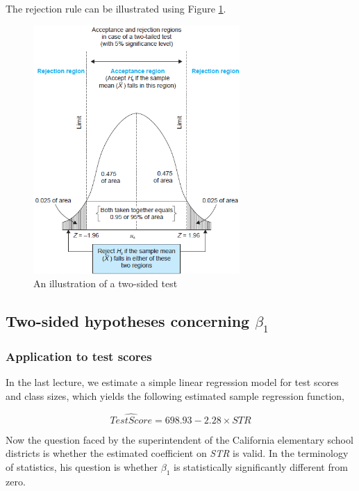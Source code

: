 \documentclass[a4paper,11pt]{article}
\begin{document}
\begin{itemize}
The rejection rule can be illustrated using Figure \ref{fig:orgf9bfd90}.

\begin{figure}[htbp]
\centering
\includegraphics[width=0.7\textwidth]{./figure/fig9_1.png}
\caption{\label{fig:orgf9bfd90}
An illustration of a two-sided test}
\end{figure}
\end{itemize}

\subsection{Two-sided hypotheses concerning \(\beta_1\)}
\label{sec:orgac15208}
\subsubsection*{Application to test scores}
\label{sec:orgaeeafd2}
In the last lecture, we estimate a simple linear regression model for test
scores and class sizes, which yields the following estimated sample
regression function,

\begin{equation}
\label{eq:testscr-str-1e}
\widehat{TestScore} = 698.93 - 2.28 \times STR
\end{equation}

Now the question faced by the superintendent of the California
elementary school districts is whether the estimated coefficient on
\emph{STR} is valid. In the terminology of statistics, his question is
whether \(\beta_1\) is statistically significantly different from zero. 
\end{document}
